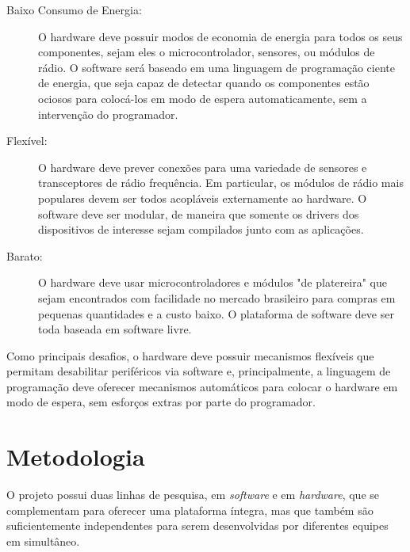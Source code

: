 \documentclass[titlepage,12pt]{article}
\begin{document}
\begin{description}
%
\item[Baixo Consumo de Energia:]
  O hardware deve possuir modos de economia de energia para todos os seus
  componentes, sejam eles o microcontrolador, sensores, ou módulos de rádio.
  O software será baseado em uma linguagem de programação ciente de energia,
  que seja capaz de detectar quando os componentes estão ociosos para
  colocá-los em modo de espera automaticamente, sem a intervenção do
  programador.
%
\item[Flexível:]
  O hardware deve prever conexões para uma variedade de sensores e
  transceptores de rádio frequência.
  Em particular, os módulos de rádio mais populares devem ser todos acopláveis
  externamente ao hardware.
  O software deve ser modular, de maneira que somente os drivers dos
  dispositivos de interesse sejam compilados junto com as aplicações.
%
\item[Barato:]
  O hardware deve usar microcontroladores e módulos "de platereira" que sejam
  encontrados com facilidade no mercado brasileiro para compras em pequenas
  quantidades e a custo baixo.
  O plataforma de software deve ser toda baseada em software livre.
%
\end{description}

Como principais desafios, o hardware deve possuir mecanismos flexíveis que
permitam desabilitar periféricos via software e, principalmente, a linguagem de
programação deve oferecer mecanismos automáticos para colocar o hardware em
modo de espera, sem esforços extras por parte do programador.

\section{Metodologia}

O projeto possui duas linhas de pesquisa, em \emph{software} e em
\emph{hardware}, que se complementam para oferecer uma plataforma íntegra, mas
que também são suficientemente independentes para serem desenvolvidas por
diferentes equipes em simultâneo.
\end{document}
